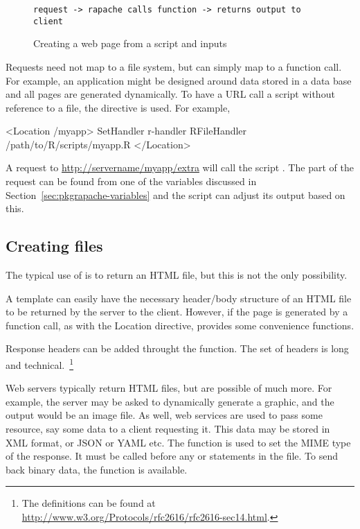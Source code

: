 \begin{figure}
  \centering
\begin{verbatim}
request -> rapache calls function -> returns output to client
\end{verbatim}
  \caption{Creating a web page from a script and inputs}
  \label{fig:rapache-location-directive}
\end{figure}
Requests need not map to a file system, but can simply map to a
function call. For example, an application might be designed around
data stored in a data base and all pages are generated dynamically. To
have a URL call a script without reference to a file, the
 directive is used. For example,
\begin{HTMLinput}
<Location /myapp>
  SetHandler r-handler
  RFileHandler /path/to/R/scripts/myapp.R
</Location>
\end{HTMLinput}
A request to \url{http://servername/myapp/extra} will call the script
. The  part of the request can be found from
one of the  variables discussed in
Section~\ref{sec:pkgrapache-variables} and the script can adjust its
output based on this.


\subsection{Creating files}
\label{sec:creating-files}

The typical use of  is to return an HTML file, but this
is not the only possibility.

A  template can easily have the necessary header/body
structure of an HTML file to be returned by the server to the
client. However, if the page is generated by a function call, as with
the Location directive,  provides some convenience functions.

Response headers can be added throught the 
function. The set of headers is long and technical.~\footnote{The
  definitions can be found at \url{http://www.w3.org/Protocols/rfc2616/rfc2616-sec14.html}.}

Web servers typically return HTML files, but are possible of much
more. For example, the server may be asked to dynamically generate a
graphic, and the output would be an image file. As well, web services
are used to pass some resource, say some data to a client requesting
it. This data may be stored in XML format, or JSON or YAML etc. The
 function is used to set the MIME type of the
response. It must be called before any  or
 statements in the file.  To send back binary data, the
function  is available.


